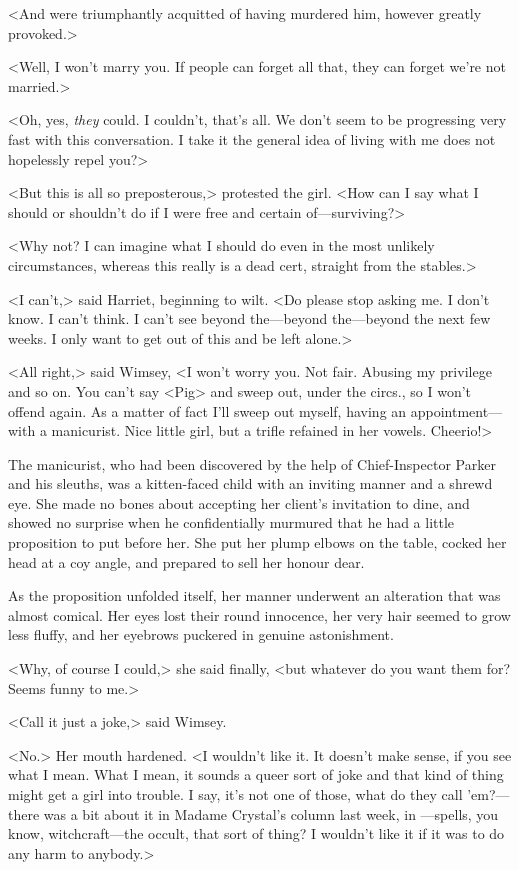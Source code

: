 <And were triumphantly acquitted of having murdered him, however greatly provoked.>

<Well, I won't marry you. If people can forget all that, they can forget we're not married.>

<Oh, yes, \emph{they} could. I couldn't, that's all. We don't seem to be progressing very fast with this conversation. I take it the general idea of living with me does not hopelessly repel you?>

<But this is all so preposterous,> protested the girl. <How can I say what I should or shouldn't do if I were free and certain of—surviving?>

<Why not? I can imagine what I should do even in the most unlikely circumstances, whereas this really is a dead cert, straight from the stables.>

<I can't,> said Harriet, beginning to wilt. <Do please stop asking me. I don't know. I can't think. I can't see beyond the—beyond the—beyond the next few weeks. I only want to get out of this and be left alone.>

<All right,> said Wimsey, <I won't worry you. Not fair. Abusing my privilege and so on. You can't say <Pig> and sweep out, under the circs., so I won't offend again. As a matter of fact I'll sweep out myself, having an appointment—with a manicurist. Nice little girl, but a trifle refained in her vowels. Cheerio!>

\divider

The manicurist, who had been discovered by the help of Chief-Inspector Parker and his sleuths, was a kitten-faced child with an inviting manner and a shrewd eye. She made no bones about accepting her client's invitation to dine, and showed no surprise when he confidentially murmured that he had a little proposition to put before her. She put her plump elbows on the table, cocked her head at a coy angle, and prepared to sell her honour dear.

As the proposition unfolded itself, her manner underwent an alteration that was almost comical. Her eyes lost their round innocence, her very hair seemed to grow less fluffy, and her eyebrows puckered in genuine astonishment.

<Why, of course I could,> she said finally, <but whatever do you want them for? Seems funny to me.>

<Call it just a joke,> said Wimsey.

<No.> Her mouth hardened. <I wouldn't like it. It doesn't make sense, if you see what I mean. What I mean, it sounds a queer sort of joke and that kind of thing might get a girl into trouble. I say, it's not one of those, what do they call 'em?—there was a bit about it in Madame Crystal's column last week, in —spells, you know, witchcraft—the occult, that sort of thing? I wouldn't like it if it was to do any harm to anybody.>

